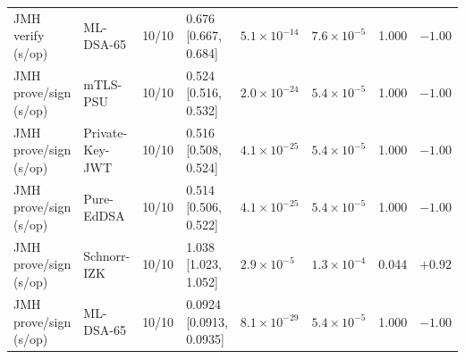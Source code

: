\begin{tabular}{@{}llrlllll@{}}
JMH verify (\textmu{}s/op) & ML-DSA-65 & 10/10 & 0.676 [0.667, 0.684] & $5.1\times10^{-14}$ & $7.6\times10^{-5}$ & 1.000 & $-1.00$ \\
JMH prove/sign (\textmu{}s/op) & mTLS-PSU & 10/10 & 0.524 [0.516, 0.532] & $2.0\times10^{-24}$ & $5.4\times10^{-5}$ & 1.000 & $-1.00$ \\
JMH prove/sign (\textmu{}s/op) & Private-Key-JWT & 10/10 & 0.516 [0.508, 0.524] & $4.1\times10^{-25}$ & $5.4\times10^{-5}$ & 1.000 & $-1.00$ \\
JMH prove/sign (\textmu{}s/op) & Pure-EdDSA & 10/10 & 0.514 [0.506, 0.522] & $4.1\times10^{-25}$ & $5.4\times10^{-5}$ & 1.000 & $-1.00$ \\
JMH prove/sign (\textmu{}s/op) & Schnorr-IZK & 10/10 & 1.038 [1.023, 1.052] & $2.9\times10^{-5}$ & $1.3\times10^{-4}$ & 0.044 & $+0.92$ \\
JMH prove/sign (\textmu{}s/op) & ML-DSA-65 & 10/10 & 0.0924 [0.0913, 0.0935] & $8.1\times10^{-29}$ & $5.4\times10^{-5}$ & 1.000 & $-1.00$ \\
\bottomrule
\end{tabular}
